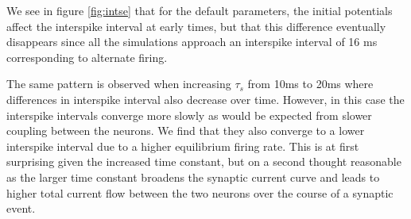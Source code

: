 \documentclass{article}
\begin{document}
We see in figure \ref{fig:intse} that for the default parameters, the initial potentials affect the interspike interval at early times, but that this difference eventually disappears since all the simulations approach an interspike interval of 16 ms corresponding to alternate firing.

The same pattern is observed when increasing $\tau_s$ from 10ms to 20ms where differences in interspike interval also decrease over time. However, in this case the interspike intervals converge more slowly as would be expected from slower coupling between the neurons. We find that they also converge to a lower interspike interval due to a higher equilibrium firing rate. This is at first surprising given the increased time constant, but on a second thought reasonable as the larger time constant broadens the synaptic current curve and leads to higher total current flow between the two neurons over the course of a synaptic event.
\end{document}
